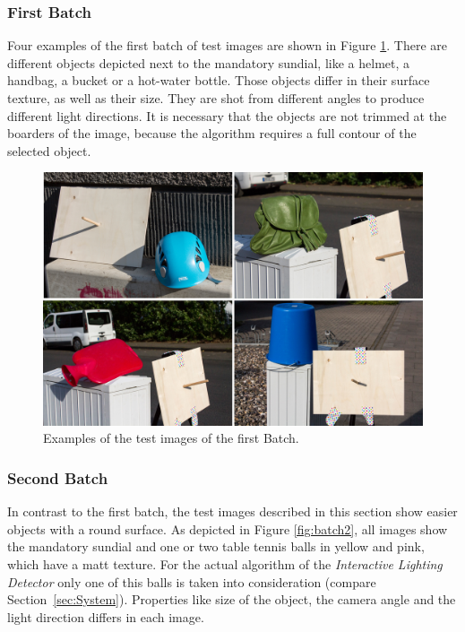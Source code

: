 \subsubsection{First Batch} \label{sec:testimagesfirst}

Four examples of the first batch of test images are shown in Figure \ref{fig:batch1}. There are different objects depicted next to the mandatory sundial, like a helmet, a handbag, a bucket or a hot-water bottle. Those objects differ in their surface texture, as well as their size. They are shot from different angles to produce different light directions. It is necessary that the objects are not trimmed at the boarders of the image, because the algorithm requires a full contour of the selected object.


\begin{figure}[H] 
	\center 
	\includegraphics[width=12cm]{Images/batch1.jpg}			
	\caption[Examples of the test images of the first Batch.]{Examples of the test images of the first Batch.}
	\label{fig:batch1}
\end{figure}

\subsubsection{Second Batch} \label{sec:testimagessecond}

In contrast to the first batch, the test images described in this section show easier objects with a round surface. As depicted in Figure \ref{fig:batch2}, all images show the mandatory sundial and one or two table tennis balls in yellow and pink, which have a matt texture. For the actual algorithm of the \textit{Interactive Lighting Detector} only one of this balls is taken into consideration (compare Section~\ref{sec:System}). Properties like size of the object, the camera angle and the light direction differs in each image.

